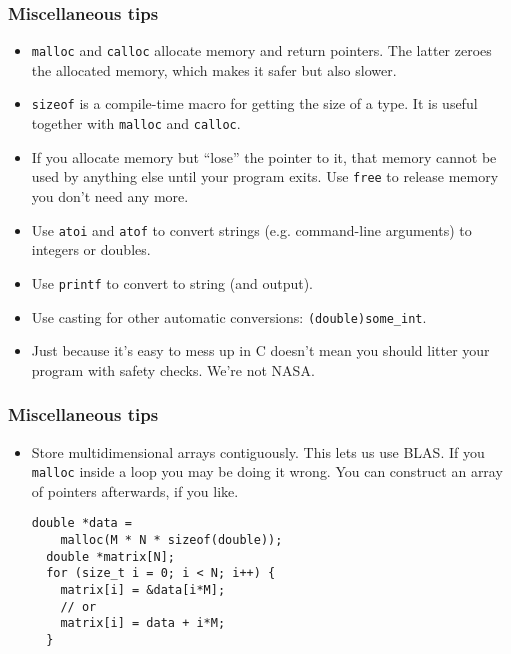 \begin{frame}
  \frametitle{Miscellaneous tips}
  \begin{itemize}
  \item \texttt{malloc} and \texttt{calloc} allocate memory and return pointers.
    The latter zeroes the allocated memory, which makes it safer but also
    slower.
  \item \texttt{sizeof} is a compile-time macro for getting the size of a type.
    It is useful together with \texttt{malloc} and \texttt{calloc}.
  \item If you allocate memory but ``lose'' the pointer to it, that memory
    cannot be used by anything else until your program exits. Use \texttt{free}
    to release memory you don't need any more.
  \item Use \texttt{atoi} and \texttt{atof} to convert strings (e.g.
    command-line arguments) to integers or doubles.
  \item Use \texttt{printf} to convert to string (and output).
  \item Use casting for other automatic conversions: \texttt{(double)some\_int}.
  \item Just because it's easy to mess up in C doesn't mean you should litter
    your program with safety checks. We're not NASA.
  \end{itemize}
\end{frame}

\begin{frame}[fragile]
  \frametitle{Miscellaneous tips}
  \begin{itemize}
  \item Store multidimensional arrays contiguously. This lets us use BLAS. If
    you \texttt{malloc} inside a loop you may be doing it wrong. You can
    construct an array of pointers afterwards, if you like.
    \begin{lstlisting}[style=c]
  double *data =
    malloc(M * N * sizeof(double));
  double *matrix[N];
  for (size_t i = 0; i < N; i++) {
    matrix[i] = &data[i*M];
    // or
    matrix[i] = data + i*M;
  }
    \end{lstlisting}
  \end{itemize}
\end{frame}


